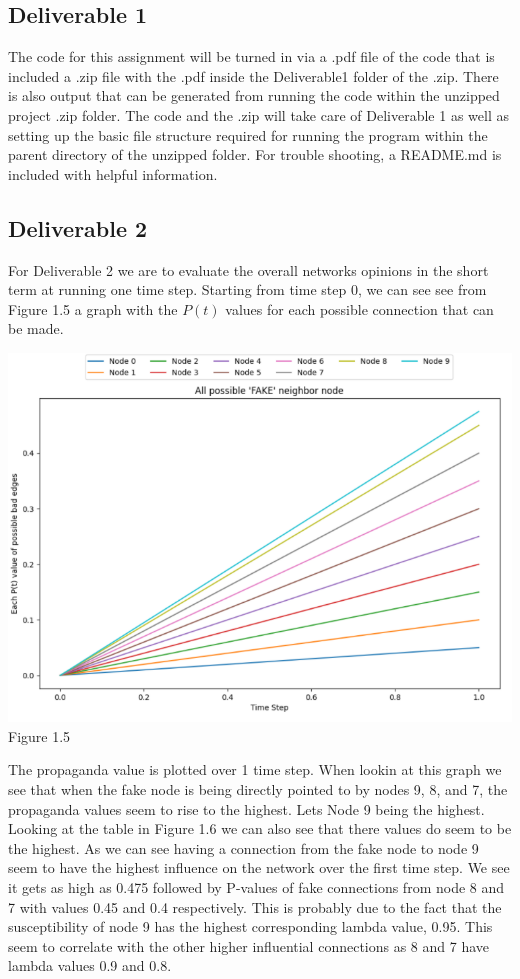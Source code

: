 \documentclass[letterpaper]{article}
\begin{document}
\subsection{ Deliverable 1 }
The code for this assignment will be turned in via a .pdf file of the code that is included a .zip file with the .pdf inside the Deliverable1 folder of the .zip.  There is also output that can be generated from running the code within the unzipped project .zip folder.  The code and the .zip will take care of Deliverable 1 as well as setting up the basic file structure required for running the program within the parent directory of the unzipped folder.  For trouble shooting, a README.md is included with helpful information. 

\subsection{ Deliverable 2 }
For Deliverable 2 we are to evaluate the overall networks opinions in the short term at running one time step.  Starting from time step 0, we can see see from Figure 1.5 a graph with the $P(t)$ values for each possible connection that can be made.  
\begin{center}
	\includegraphics[scale=0.9]{./Images/Figure1.5} \\
	Figure 1.5
\end{center}
The propaganda value is plotted over 1 time step.  When lookin at this graph we see that when the fake node is being directly pointed to by nodes  9, 8, and 7, the propaganda values seem to rise to the highest.  Lets Node 9 being the highest.  Looking at the table in Figure 1.6 we can also see that there values do seem to be the highest.   As we can see having a connection from the fake node to node 9 seem to have the highest influence on the network over the first time step.  We see it gets as high as 0.475 followed by P-values of fake connections from node 8 and 7 with values 0.45 and 0.4 respectively.  This is probably due to the fact that the susceptibility of node 9 has the highest  corresponding lambda value, 0.95.  This seem to correlate with the other higher influential connections as 8 and 7 have lambda values 0.9 and 0.8. \\
\end{document}
